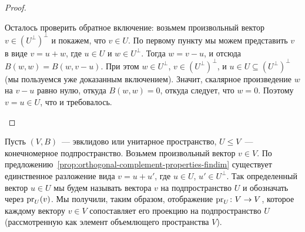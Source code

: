\begin{proof}
\begin{enumerate}
  Осталось проверить обратное включение: возьмем произвольный вектор
  $v\in (U^\perp)^\perp$ и покажем, что $v\in U$.
  По первому пункту мы можем представить $v$ в виде $v = u + w$,
  где $u\in U$ и $w\in U^\perp$. Тогда $w = v - u$, и отсюда
  $B(w, w) = B(w, v - u)$. При этом $w\in U^\perp$, $v\in (U^\perp)^\perp$,
  и $u\in U\subseteq (U^\perp)^\perp$ (мы пользуемся уже доказанным включением).
  Значит, скалярное произведение $w$ на $v-u$ равно нулю, откуда $B(w,w)=0$,
  откуда следует, что $w=0$.
  Поэтому $v = u\in U$, что и требовалось.
\end{enumerate}
\end{proof}

\begin{definition}
Пусть $(V,B)$~--- эвклидово или унитарное пространство,
$U\leq V$~--- конечномерное подпространство.
Возьмем произвольный вектор $v\in V$.
По предложению~\ref{prop:orthogonal-complement-properties-findim}
существует единственное разложение вида
$v = u + u'$, где $u\in U$, $u'\in U^\perp$.
Так определенный вектор $u\in U$ мы будем называть
 вектора $v$ на подпространство $U$
и обозначать через $\operatorname{pr}_U(v)$.
Мы получили, таким образом, отображение
$\operatorname{pr}_U\colon V\to V$, которое каждому вектору $v\in V$
сопоставляет его проекцию на подпространство $U$
(рассмотренную как элемент объемлющего пространства $V$).
\end{definition}

